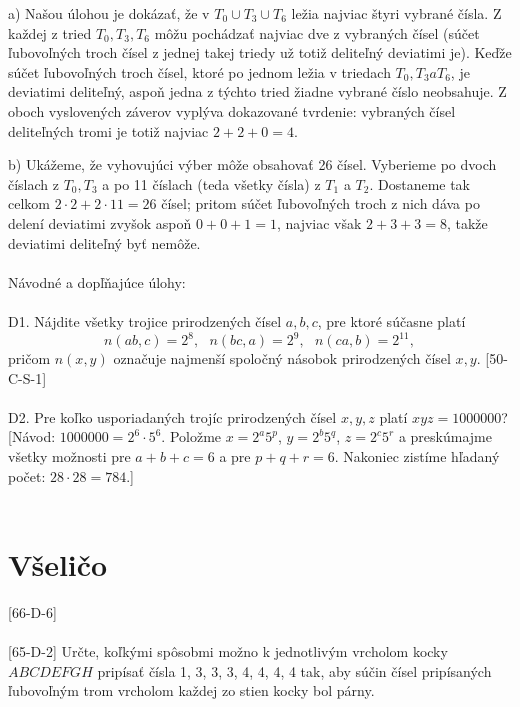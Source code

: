 a) Našou úlohou je dokázať, že v $T_0\cup T_3 \cup T_6$ ležia najviac štyri vybrané čísla. Z každej z tried $T_0, T_3, T_6$ môžu pochádzať najviac dve z vybraných čísel (súčet ľubovoľných troch čísel z jednej takej triedy už totiž deliteľný deviatimi je). Keďže súčet ľubovoľných troch čísel, ktoré po jednom ležia v triedach $T_0, T_3 a T_6$, je deviatimi deliteľný, aspoň jedna z týchto tried žiadne vybrané číslo neobsahuje. Z oboch vyslovených záverov vyplýva dokazované tvrdenie: vybraných čísel deliteľných tromi je totiž najviac $2 + 2 + 0 = 4$.

b) Ukážeme, že vyhovujúci výber môže obsahovať 26 čísel. Vyberieme po dvoch číslach z $T_0, T_3$ a po 11 číslach (teda všetky čísla) z $T_1$ a $T_2$. Dostaneme tak celkom $2 \cdot 2 + 2 \cdot 11 = 26$ čísel; pritom súčet ľubovoľných troch z nich dáva po delení deviatimi zvyšok aspoň $0 + 0 + 1 = 1$, najviac však $2 + 3 + 3 = 8$, takže deviatimi deliteľný byť
nemôže.\\
\\

Návodné a dopľňajúce úlohy:\\
\\

D1. Nájdite všetky trojice prirodzených čísel $a, b, c$, pre ktoré súčasne platí
$$ n(ab,c) = 2^8, \ \ \  n(bc,a) = 2^9, \ \ \ n(ca,b) = 2^11,$$
pričom $n(x, y)$ označuje najmenší spoločný násobok prirodzených čísel $x, y$. [50-C-S-1]\\
\\
D2. Pre koľko usporiadaných trojíc prirodzených čísel $x, y, z$ platí $xyz = 1 000 000$? [Návod: $1 000 000 = 2^6\cdot5^6$. Položme $x = 2^a5^p$, $y = 2^b5^q$, $z = 2^c5^r$ a preskúmajme všetky možnosti pre $a + b + c = 6$ a pre $p + q + r = 6$. Nakoniec zistíme hľadaný počet: $28\cdot28 = 784$.]\\
\\

\section{Všeličo}
\begin{tcolorbox}[breakable,notitle,boxrule=0pt,colback=light-gray,colframe=light-gray]\ul [66-D-6]\\
\\

\ul [65-D-2]
Určte, koľkými spôsobmi možno k jednotlivým vrcholom kocky $ABCDEFGH$ pripísať čísla 1, 3, 3, 3, 4, 4, 4, 4 tak, aby súčin čísel pripísaných ľubovoľným trom vrcholom každej zo stien kocky bol párny.

\end{tcolorbox}

